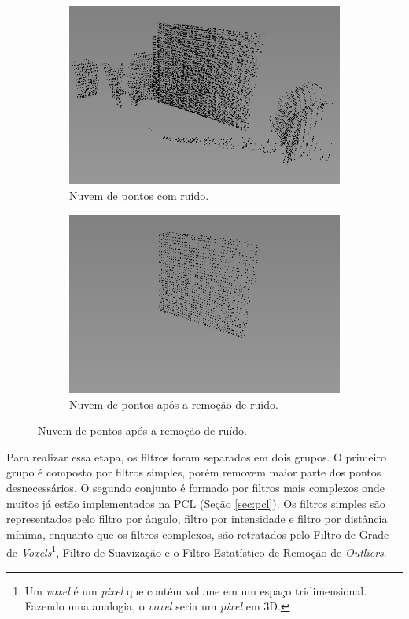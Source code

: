 \begin{figure}[H]
    \centering
    \caption{Processo de remoção de ruído em uma nuvem de pontos.}
    \label{fig:point_cloud_denoise}
    \begin{subfigure}[t]{0.49\textwidth}
        \includegraphics[width=\textwidth]{dados/figuras/pc_noise.png}
        \caption{Nuvem de pontos com ruído.}
    \end{subfigure}
    \begin{subfigure}[t]{0.49\textwidth}
        \includegraphics[width=\textwidth]{dados/figuras/pc_denoise.png}
        \caption{Nuvem de pontos após a remoção de ruído.}
    \end{subfigure}
\end{figure}

Para realizar essa etapa, os filtros foram separados em dois grupos.
O primeiro grupo é composto por filtros simples, porém removem maior parte dos pontos desnecessários. 
O segundo conjunto é formado por filtros mais complexos onde muitos já estão implementados na PCL (Seção \ref{sec:pcl}).
Os filtros simples são representados pelo filtro por ângulo, filtro por intensidade e filtro por distância mínima, enquanto que os filtros complexos, são retratados pelo Filtro de Grade de \textit{Voxels}\footnote{Um \textit{voxel} é um \textit{pixel} que contém volume em um espaço tridimensional. Fazendo uma analogia, o \textit{voxel} seria um \textit{pixel} em 3D.}, Filtro de Suavização e o Filtro Estatístico de Remoção de \textit{Outliers}.


